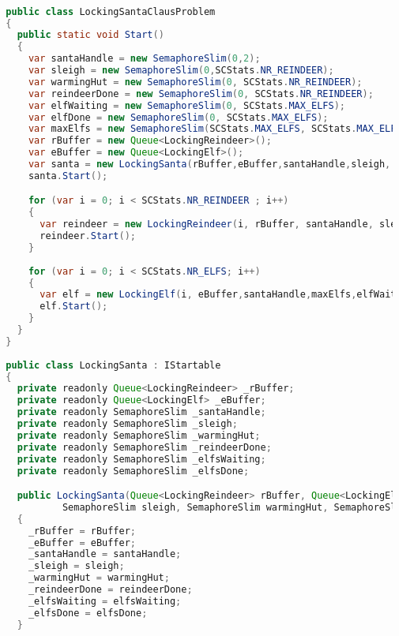 \begin{lstlisting}[label=lst:impl_santa_lock,
  caption={Lock based Santa Clause Implementation},
  language=Java,  
  showspaces=false,
  showtabs=false,
  breaklines=true,
  showstringspaces=false,
  breakatwhitespace=true,
  commentstyle=\color{greencomments},
  keywordstyle=\color{bluekeywords},
  stringstyle=\color{redstrings},
  escapechar=~,
  morekeywords={atomic, retry, orelse, var, get, set, ref, out, readonly, virtual, override, lock}]  % Start your code-block

  public class LockingSantaClausProblem
  {
    public static void Start()
    {
      var santaHandle = new SemaphoreSlim(0,2); 
      var sleigh = new SemaphoreSlim(0,SCStats.NR_REINDEER);
      var warmingHut = new SemaphoreSlim(0, SCStats.NR_REINDEER);
      var reindeerDone = new SemaphoreSlim(0, SCStats.NR_REINDEER);
      var elfWaiting = new SemaphoreSlim(0, SCStats.MAX_ELFS);
      var elfDone = new SemaphoreSlim(0, SCStats.MAX_ELFS);
      var maxElfs = new SemaphoreSlim(SCStats.MAX_ELFS, SCStats.MAX_ELFS);
      var rBuffer = new Queue<LockingReindeer>();
      var eBuffer = new Queue<LockingElf>();
      var santa = new LockingSanta(rBuffer,eBuffer,santaHandle,sleigh, warmingHut,reindeerDone,elfWaiting, elfDone);
      santa.Start();

      for (var i = 0; i < SCStats.NR_REINDEER ; i++)
      {
        var reindeer = new LockingReindeer(i, rBuffer, santaHandle, sleigh, warmingHut, reindeerDone);
        reindeer.Start();
      }
            
      for (var i = 0; i < SCStats.NR_ELFS; i++)
      {
        var elf = new LockingElf(i, eBuffer,santaHandle,maxElfs,elfWaiting,elfDone);
        elf.Start();
      }
    }
  }
  
  public class LockingSanta : IStartable
  {
    private readonly Queue<LockingReindeer> _rBuffer;
    private readonly Queue<LockingElf> _eBuffer;
    private readonly SemaphoreSlim _santaHandle;
    private readonly SemaphoreSlim _sleigh;
    private readonly SemaphoreSlim _warmingHut;
    private readonly SemaphoreSlim _reindeerDone;
    private readonly SemaphoreSlim _elfsWaiting;
    private readonly SemaphoreSlim _elfsDone;

    public LockingSanta(Queue<LockingReindeer> rBuffer, Queue<LockingElf> eBuffer, SemaphoreSlim santaHandle,
            SemaphoreSlim sleigh, SemaphoreSlim warmingHut, SemaphoreSlim reindeerDone, SemaphoreSlim elfsWaiting, SemaphoreSlim elfsDone)
    {
      _rBuffer = rBuffer;
      _eBuffer = eBuffer;
      _santaHandle = santaHandle;
      _sleigh = sleigh;
      _warmingHut = warmingHut;
      _reindeerDone = reindeerDone;
      _elfsWaiting = elfsWaiting;
      _elfsDone = elfsDone;
    }


\end{lstlisting}
